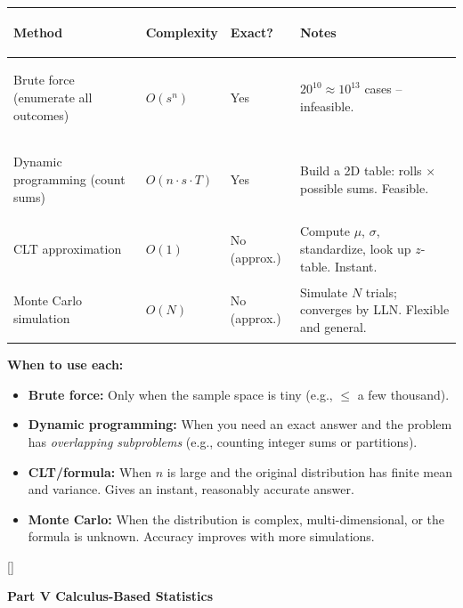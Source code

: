 \documentclass[11pt, letterpaper]{article}
\newcommand{\tealsections}{%
  \titleformat{\section}{\large\bfseries\color{sectionteal}}{}{0em}{}[\color{sectionteal}\titlerule]%
  \titleformat{\subsection}{\normalsize\bfseries\color{sectionteal!80!black}}{}{0em}{}%
}
\newcommand{\partbanner}[3]{%
  \begin{tcolorbox}[colback=#1, colframe=#2, boxrule=1.2pt, arc=4pt,
    left=8pt, right=8pt, top=6pt, bottom=6pt]
    \begin{center}{\LARGE\bfseries #3}\end{center}
  \end{tcolorbox}%
}
\begin{document}
\noindent
{\renewcommand{\arraystretch}{1.6}
\begin{tabularx}{\textwidth}{>{\bfseries\raggedright\arraybackslash}p{3.5cm}
                              >{\centering\arraybackslash}p{2.4cm}
                              >{\centering\arraybackslash}p{2cm}
                              >{\raggedright\arraybackslash}X}
\toprule
\rowcolor{tableheaderorange}
\textbf{Method} & \textbf{Complexity} & \textbf{Exact?} & \textbf{Notes} \\
\midrule
\rowcolor{rowOr} Brute force (enumerate all outcomes) & $O(s^n)$ & Yes & $20^{10} \approx 10^{13}$ cases -- infeasible. \\
\rowcolor{rowA}  Dynamic programming (count sums) & $O(n \cdot s \cdot T)$ & Yes & Build a 2D table: rolls $\times$ possible sums. Feasible. \\
\rowcolor{rowOr} CLT approximation & $O(1)$ & No (approx.) & Compute $\mu$, $\sigma$, standardize, look up $z$-table. Instant. \\
\rowcolor{rowA}  Monte Carlo simulation & $O(N)$ & No (approx.) & Simulate $N$ trials; converges by LLN. Flexible and general. \\
\bottomrule
\end{tabularx}}

\begin{tcolorbox}[colback=part4bg, colframe=sectionorange, arc=3pt, boxrule=1pt]
\textbf{When to use each:}
\begin{itemize}[noitemsep, leftmargin=*]
  \item \textbf{Brute force:} Only when the sample space is tiny (e.g., $\leq$ a few thousand).
  \item \textbf{Dynamic programming:} When you need an exact answer and the problem has \emph{overlapping subproblems} (e.g., counting integer sums or partitions).
  \item \textbf{CLT/formula:} When $n$ is large and the original distribution has finite mean and variance. Gives an instant, reasonably accurate answer.
  \item \textbf{Monte Carlo:} When the distribution is complex, multi-dimensional, or the formula is unknown. Accuracy improves with more simulations.
\end{itemize}
\end{tcolorbox}

\newpage

\tealsections
{}
\partbanner{part5bg}{sectionteal}{Part V \quad Calculus-Based Statistics}
\end{document}
